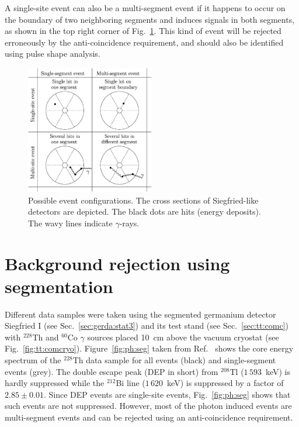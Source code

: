 A single-site event can also be a multi-segment event if it happens to occur on the boundary of two neighboring segments and induces signals in both segments, as shown in the top right corner of Fig.~\ref{fig:ph:eve}. This kind of event will be rejected erroneously by the anti-coincidence requirement, and should also be identified using pulse shape analysis.

\begin{figure}
\centering
\includegraphics[width=0.5\textwidth]{events}
\caption{Possible event configurations. The cross sections of Siegfried-like detectors are depicted. The black dots are hits (energy deposits). The wavy lines indicate $\gamma$-rays.}
\label{fig:ph:eve}
\end{figure}

\section{Background rejection using segmentation}
\label{sec:ph:seg}
Different data samples were taken using the segmented germanium detector Siegfried I (see Sec.~\ref{sec:gerda:stat3}) and its test stand (see Sec.~\ref{sec:tt:comc}) with $^{228}$Th and $^{60}$Co $\gamma$ sources placed 10~cm above the vacuum cryostat (see Fig.~\ref{fig:tt:comcryo}). Figure~\ref{fig:ph:seg} taken from Ref.~\cite{Pid07} shows the core energy spectrum of the $^{228}$Th data sample for all events (black) and single-segment events (grey). The double escape peak (DEP in short) from $^{208}$Tl ($1\,593$~keV) is hardly suppressed while the $^{212}$Bi line ($1\,620$~keV) is suppressed by a factor of $2.85 \pm 0.01$. Since DEP events are single-site events, Fig.~\ref{fig:ph:seg} shows that such events are not suppressed. However, most of the photon induced events are multi-segment events and can be rejected using an anti-coincidence requirement.

